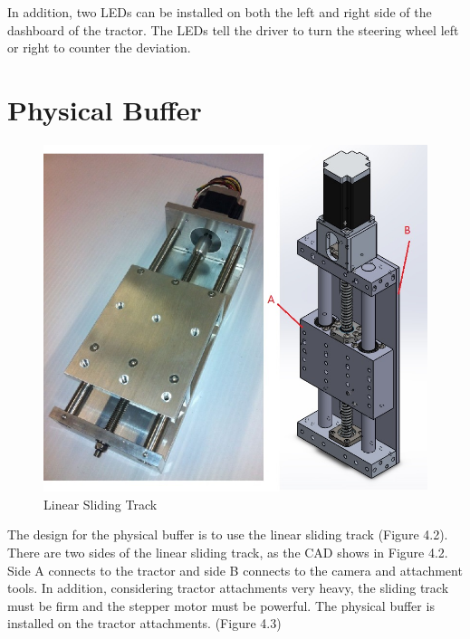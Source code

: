 In addition, two LEDs can be installed on both the left and right side of the dashboard of the tractor. The LEDs tell the driver to turn the steering wheel left or right to counter the deviation. 


\section{Physical Buffer}

\begin{figure}[ht!]
\begin{center}
\includegraphics[scale = 0.6]{pics/1D.jpg}
\caption{Linear Sliding Track}
\end{center}
\end{figure}
The design for the physical buffer is to use the linear sliding track (Figure 4.2). There are two sides of the linear sliding track, as the CAD shows in Figure 4.2. Side A connects to the tractor and side B connects to the camera and attachment tools. In addition, considering tractor attachments very heavy, the sliding track must be firm and the stepper motor must be powerful. The physical buffer is installed on the tractor attachments. (Figure 4.3)
